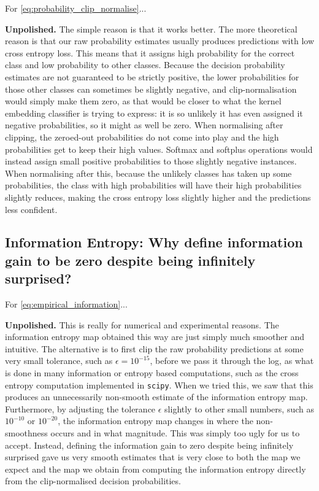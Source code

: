 \documentclass{article}
\newcommand{\note}[1]{{\color{orange} #1}}
\begin{document}
		For \eqref{eq:probability_clip_normalise}...
		
		\note{\textbf{Unpolished.}} The simple reason is that it works better. The more theoretical reason is that our raw probability estimates usually produces predictions with low cross entropy loss. This means that it assigns high probability for the correct class and low probability to other classes. Because the decision probability estimates are not guaranteed to be strictly positive, the lower probabilities for those other classes can sometimes be slightly negative, and clip-normalisation would simply make them zero, as that would be closer to what the kernel embedding classifier is trying to express: it is so unlikely it has even assigned it negative probabilities, so it might as well be zero. When normalising after clipping, the zeroed-out probabilities do not come into play and the high probabilities get to keep their high values. Softmax and softplus operations would instead assign small positive probabilities to those slightly negative instances. When normalising after this, because the unlikely classes has taken up some probabilities, the class with high probabilities will have their high probabilities slightly reduces, making the cross entropy loss slightly higher and the predictions less confident.
		
	\subsection{Information Entropy: Why define information gain to be zero despite being infinitely surprised?}
	
		For \eqref{eq:empirical_information}...
		
		\note{\textbf{Unpolished.}} This is really for numerical and experimental reasons. The information entropy map obtained this way are just simply much smoother and intuitive. The alternative is to first clip the raw probability predictions at some very small tolerance, such as $\epsilon = 10^{-15}$, before we pass it through the log, as what is done in many information or entropy based computations, such as the cross entropy computation implemented in \texttt{scipy}. When we tried this, we saw that this produces an unnecessarily non-smooth estimate of the information entropy map. Furthermore, by adjusting the tolerance $\epsilon$ slightly to other small numbers, such as $10^{-10}$ or $10^{-20}$, the information entropy map changes in where the non-smoothness occurs and in what magnitude. This was simply too ugly for us to accept. Instead, defining the information gain to zero despite being infinitely surprised gave us very smooth estimates that is very close to both the map we expect and the map we obtain from computing the information entropy directly from the clip-normalised decision probabilities.
		
\end{document}
